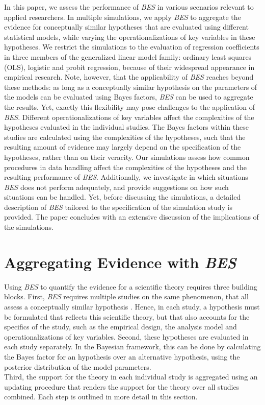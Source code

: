 \documentclass[review, 3p, authoryear]{elsarticle} %
\begin{document}
In this paper, we assess the performance of \emph{BES} in various scenarios relevant to applied researchers.
In multiple simulations, we apply \emph{BES} to aggregate the evidence for conceptually similar hypotheses that are evaluated using different statistical models, while varying the operationalizations of key variables in these hypotheses.
We restrict the simulations to the evaluation of regression coefficients in three members of the generalized linear model family: ordinary least squares (OLS), logistic and probit regression, because of their widespread appearance in empirical research.
Note, however, that the applicability of \emph{BES} reaches beyond these methods: as long as a conceptually similar hypothesis on the parameters of the models can be evaluated using Bayes factors, \emph{BES} can be used to aggregate the results.
Yet, exactly this flexibility may pose challenges to the application of \emph{BES}.
Different operationalizations of key variables affect the complexities of the hypotheses evaluated in the individual studies.
The Bayes factors within these studies are calculated using the complexities of the hypotheses, such that the resulting amount of evidence may largely depend on the specification of the hypotheses, rather than on their veracity.
Our simulations assess how common procedures in data handling affect the complexities of the hypotheses and the resulting performance of \emph{BES}.
Additionally, we investigate in which situations \emph{BES} does not perform adequately, and provide suggestions on how such situations can be handled.
Yet, before discussing the simulations, a detailed description of \emph{BES} tailored to the specification of the simulation study is provided.
The paper concludes with an extensive discussion of the implications of the simulations.

\hypertarget{aggregating-evidence-with-bes}{%
\section{\texorpdfstring{Aggregating Evidence with \emph{BES}}{Aggregating Evidence with BES}}\label{aggregating-evidence-with-bes}}

Using \emph{BES} to quantify the evidence for a scientific theory requires three building blocks.
First, \emph{BES} requires multiple studies on the same phenomenon, that all assess a conceptually similar hypothesis \citep{kuiper_combining_2013}.
Hence, in each study, a hypothesis must be formulated that reflects this scientific theory, but that also accounts for the specifics of the study, such as the empirical design, the analysis model and operationalizations of key variables.
Second, these hypotheses are evaluated in each study separately.
In the Bayesian framework, this can be done by calculating the Bayes factor for an hypothesis over an alternative hypothesis, using the posterior distribution of the model parameters.\\
Third, the support for the theory in each individual study is aggregated using an updating procedure that renders the support for the theory over all studies combined.
Each step is outlined in more detail in this section.
\end{document}
